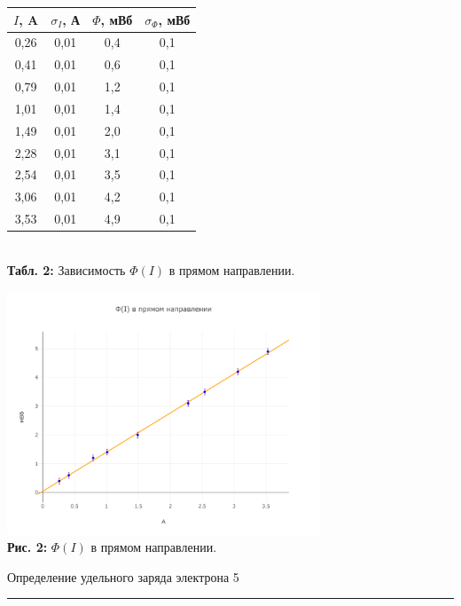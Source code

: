 \documentclass[12pt,a4paper]{scrartcl}
\begin{document}
  \begin{center}
  \begin{tabular}{|c|c|c|c|}
\hline
$I$, A & $\sigma_I$, А & $\Phi$, мВб & $\sigma_{\Phi}$, мВб \\ \hline
0,26 & 0,01 & 0,4 & 0,1 \\ \hline
0,41 & 0,01 & 0,6 & 0,1 \\ \hline
0,79 & 0,01 & 1,2 & 0,1 \\ \hline
1,01 & 0,01 & 1,4 & 0,1 \\ \hline
1,49 & 0,01 & 2,0 & 0,1 \\ \hline
2,28 & 0,01 & 3,1 & 0,1 \\ \hline
2,54 & 0,01 & 3,5 & 0,1 \\ \hline
3,06 & 0,01 & 4,2 & 0,1 \\ \hline
3,53 & 0,01 & 4,9 & 0,1 \\ \hline
\end{tabular}\\
  \textbf{Табл. 2:} Зависимость $\Phi (I)$ в прямом направлении.\\
  \end{center}
  
    \begin{center}
    \includegraphics[width = 0.7\textwidth]{PIC_2.png}\\
  \textbf{Рис. 2:} $\Phi (I)$ в прямом направлении.
  \end{center}
  
	\newpage
	
	\begin{flushleft}
		\footnotesize{Определение удельного заряда электрона} \hspace{\fill} \footnotesize{5}
		\\[-0.3cm]\noindent\rule{\textwidth}{0.3pt}
	\end{flushleft}  
  
\end{document}
